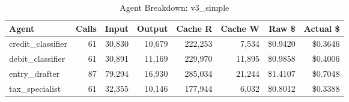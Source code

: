 \begin{table}[htbp]
\centering
\caption{Agent Breakdown: v3\_simple}
\label{tab:agent-v3-simple}
\begin{tabular}{l r rr rr rr}
\toprule
Agent & Calls & Input & Output & Cache R & Cache W & Raw \$ & Actual \$ \\
\midrule
  credit\_classifier & 61 & 30,830 & 10,679 & 222,253 & 7,534 & \$0.9420 & \$0.3646 \\
  debit\_classifier & 61 & 30,891 & 11,169 & 229,970 & 11,895 & \$0.9858 & \$0.4006 \\
  entry\_drafter & 87 & 79,294 & 16,930 & 285,034 & 21,244 & \$1.4107 & \$0.7048 \\
  tax\_specialist & 61 & 32,355 & 10,146 & 177,944 & 6,032 & \$0.8012 & \$0.3388 \\
\bottomrule
\end{tabular}
\end{table}
